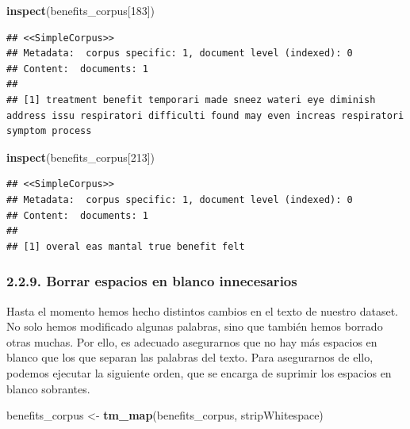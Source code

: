 \documentclass[spanish,]{article}
\newenvironment{Shaded}{\begin{snugshade}}{\end{snugshade}}
\newcommand{\DecValTok}[1]{\textcolor[rgb]{0.00,0.00,0.81}{#1}}
\newcommand{\KeywordTok}[1]{\textcolor[rgb]{0.13,0.29,0.53}{\textbf{#1}}}
\newcommand{\NormalTok}[1]{#1}
\newcommand{\StringTok}[1]{\textcolor[rgb]{0.31,0.60,0.02}{#1}}
\begin{document}
\begin{Shaded}
\begin{Highlighting}[]
\KeywordTok{inspect}\NormalTok{(benefits_corpus[}\DecValTok{183}\NormalTok{])}
\end{Highlighting}
\end{Shaded}

\begin{verbatim}
## <<SimpleCorpus>>
## Metadata:  corpus specific: 1, document level (indexed): 0
## Content:  documents: 1
## 
## [1] treatment benefit temporari made sneez wateri eye diminish address issu respiratori difficulti found may even increas respiratori symptom process
\end{verbatim}

\begin{Shaded}
\begin{Highlighting}[]
\KeywordTok{inspect}\NormalTok{(benefits_corpus[}\DecValTok{213}\NormalTok{])}
\end{Highlighting}
\end{Shaded}

\begin{verbatim}
## <<SimpleCorpus>>
## Metadata:  corpus specific: 1, document level (indexed): 0
## Content:  documents: 1
## 
## [1] overal eas mantal true benefit felt
\end{verbatim}

\hypertarget{borrar-espacios-en-blanco-innecesarios}{%
\subsubsection{2.2.9. Borrar espacios en blanco
innecesarios}\label{borrar-espacios-en-blanco-innecesarios}}

Hasta el momento hemos hecho distintos cambios en el texto de nuestro
dataset. No solo hemos modificado algunas palabras, sino que también
hemos borrado otras muchas. Por ello, es adecuado asegurarnos que no hay
más espacios en blanco que los que separan las palabras del texto. Para
asegurarnos de ello, podemos ejecutar la siguiente orden, que se encarga
de suprimir los espacios en blanco sobrantes.

\begin{Shaded}
\begin{Highlighting}[]
\NormalTok{benefits_corpus <-}\StringTok{ }\KeywordTok{tm_map}\NormalTok{(benefits_corpus, stripWhitespace) }
\end{Highlighting}
\end{Shaded}
\end{document}
